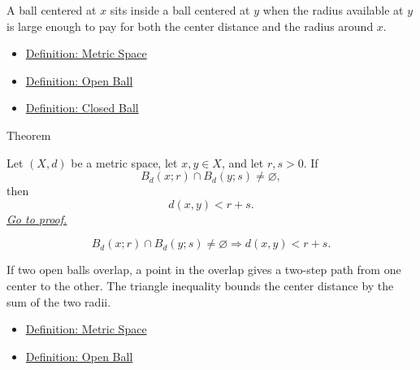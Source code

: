 \begin{remark*}[Interpretation]
A ball centered at \(x\) sits inside a ball centered at \(y\) when the radius
available at \(y\) is large enough to pay for both the center distance and
the radius around \(x\).
\end{remark*}

\begin{dependencies}
\begin{itemize}
  \item \hyperref[def:metric-space]{Definition: Metric Space}
  \item \hyperref[def:metric-open-ball]{Definition: Open Ball}
  \item \hyperref[def:metric-closed-ball]{Definition: Closed Ball}
\end{itemize}
\end{dependencies}

\begin{theorembox}{Theorem}
\begin{theorem}
\label{thm:metric-intersecting-balls-center-distance-bound}
Let \((X,d)\) be a metric space, let \(x,y\in X\), and let \(r,s>0\).  If
\[
  B_d(x;r)\cap B_d(y;s)\neq\varnothing,
\]
then
\[
  d(x,y)<r+s.
\]
\hyperref[prf:metric-intersecting-balls-center-distance-bound]{\textit{Go to proof.}}
\end{theorem}
\end{theorembox}

\begin{remark*}
\[
B_d(x;r)\cap B_d(y;s)\neq\varnothing
\Longrightarrow
d(x,y)<r+s.
\]
\end{remark*}

\begin{remark*}[Interpretation]
If two open balls overlap, a point in the overlap gives a two-step path from
one center to the other.  The triangle inequality bounds the center distance
by the sum of the two radii.
\end{remark*}

\begin{dependencies}
\begin{itemize}
  \item \hyperref[def:metric-space]{Definition: Metric Space}
  \item \hyperref[def:metric-open-ball]{Definition: Open Ball}
\end{itemize}
\end{dependencies}

